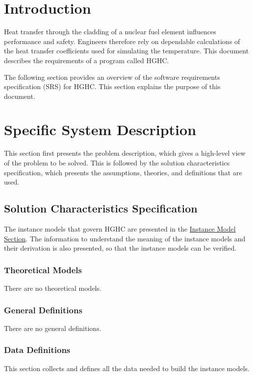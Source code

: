 \documentclass[12pt]{article}
\begin{document}
\section{Introduction}
\label{Sec:Intro}
Heat transfer through the cladding of a nuclear fuel element influences performance and safety. Engineers therefore rely on dependable calculations of the heat transfer coefficients used for simulating the temperature. This document describes the requirements of a program called HGHC.

The following section provides an overview of the software requirements specification (SRS) for HGHC. This section explains the purpose of this document.

\section{Specific System Description}
\label{Sec:SpecSystDesc}
This section first presents the problem description, which gives a high-level view of the problem to be solved. This is followed by the solution characteristics specification, which presents the assumptions, theories, and definitions that are used.

\subsection{Solution Characteristics Specification}
\label{Sec:SolCharSpec}
The instance models that govern HGHC are presented in the \hyperref[Sec:IMs]{Instance Model Section}. The information to understand the meaning of the instance models and their derivation is also presented, so that the instance models can be verified.

\subsubsection{Theoretical Models}
\label{Sec:TMs}
There are no theoretical models.

\subsubsection{General Definitions}
\label{Sec:GDs}
There are no general definitions.

\subsubsection{Data Definitions}
\label{Sec:DDs}
This section collects and defines all the data needed to build the instance models.
\end{document}
